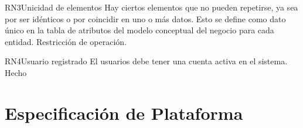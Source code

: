 \begin{BussinesRule}{RN3}{Unicidad de elementos} 
	\BRitem[Descripción:] Hay ciertos elementos que no pueden repetirse, ya sea por ser idénticos o por coincidir en uno o más datos. Esto se define como dato único en la tabla de atributos del modelo conceptual del negocio para cada entidad.
	\BRitem[Tipo:] Restricción de operación.	
\end{BussinesRule}

\begin{BussinesRule}{RN4}{Usuario registrado} 
	\BRitem[Descripción:] El usuarios debe tener una cuenta activa en el sistema.
	\BRitem[Tipo:] Hecho
\end{BussinesRule}

\section{Especificación de Plataforma}



